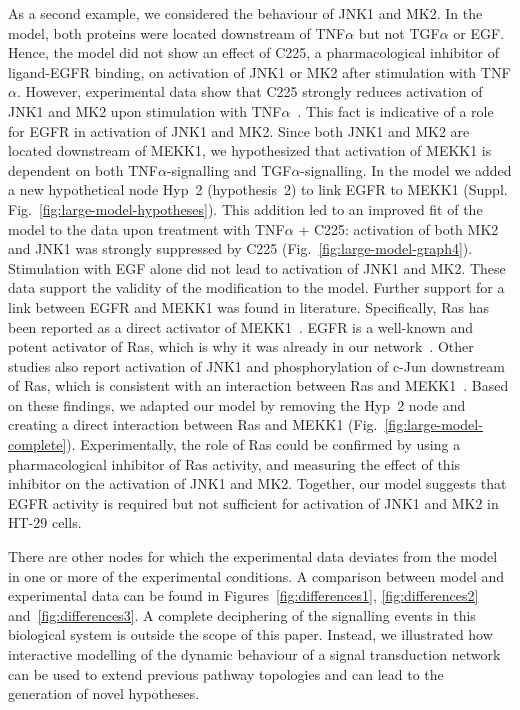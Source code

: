 \documentclass{bmcart}
\begin{document}
As a second example, we considered the behaviour of JNK1 and MK2. In the model, both
proteins were located downstream of TNF$\alpha$ but not TGF$\alpha$ or EGF. Hence, the
model did not show an effect of C225, a pharmacological inhibitor of ligand-EGFR
binding, on activation of JNK1 or MK2 after stimulation with TNF$\alpha$. However, experimental
data show that C225 strongly reduces activation of JNK1 and MK2 upon stimulation with
TNF$\alpha$~\cite{pathway-autocrine}.
This fact is indicative of a role for EGFR in activation of JNK1 and MK2. Since both JNK1 and MK2
are located downstream of MEKK1, we hypothesized that activation
of MEKK1 is dependent on
both TNF$\alpha$-signalling and TGF$\alpha$-signalling. In the model we added a new
hypothetical node {\sf Hyp~2} (hypothesis~2) to link EGFR to MEKK1 (Suppl. Fig.~\ref{fig:large-model-hypotheses}).
This addition led to an improved fit of the model to the data upon treatment with TNF$\alpha$ + C225:
activation of both MK2 and JNK1 was strongly suppressed by C225 (Fig.~\ref{fig:large-model-graph4}).
Stimulation with EGF alone did not lead to activation of JNK1 and MK2.
These data support the validity of the modification to the model.
Further support for a link between EGFR and MEKK1 was found in literature. Specifically,
Ras has been reported as a direct activator of
MEKK1~\cite{ras-mekk1}. EGFR is a well-known and potent activator of Ras,
which is why it was already in our network~\cite{kegg}.
Other studies also report activation of JNK1 and phosphorylation of c-Jun downstream of Ras, which is consistent with
an interaction between Ras and MEKK1~\cite{cfos-cjun,ras-jnk1}.
Based on these findings, we adapted
our model by removing the {\sf Hyp~2} node and creating a direct interaction between Ras
and MEKK1 (Fig.~\ref{fig:large-model-complete}). Experimentally, the role of Ras could be confirmed by using a
pharmacological inhibitor of Ras activity, and measuring the effect of this inhibitor on the activation of JNK1 and MK2.
Together, our model suggests that EGFR activity is required
but not sufficient for activation of JNK1 and MK2 in HT-29 cells.


There are other nodes for which the experimental data deviates from the model in one or more of the experimental conditions.
A comparison between model and experimental data can be found in Figures~\ref{fig:differences1}, \ref{fig:differences2} and~\ref{fig:differences3}.
A complete deciphering of the signalling events
in this biological system is outside the scope of this paper. Instead, we illustrated how interactive modelling of the dynamic behaviour
of a signal transduction network can be used to extend previous pathway topologies and can lead to the generation of novel hypotheses.
\end{document}
